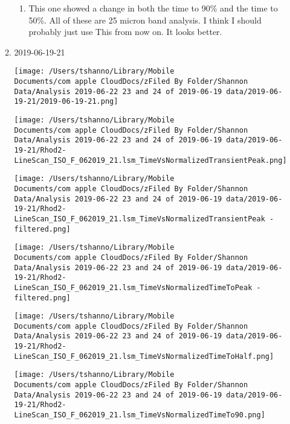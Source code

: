 \documentclass[11pt]{article}
\begin{document}
\begin{enumerate}
\begin{enumerate}
\begin{center}
\end{center}
\begin{enumerate}
\item This one showed a change in both the time to 90\% and the time to 50\%.  All of these are 25 micron band analysis.  I think I should probably just use This from now on.  It looks better.
\label{sec:orge5cdcd6}
\end{enumerate}
\item 2019-06-19-21
\label{sec:org0ad15fa}
\begin{center}
\texttt{[image: /Users/tshanno/Library/Mobile Documents/com~apple~CloudDocs/zFiled By Folder/Shannon Data/Analysis 2019-06-22 23 and 24 of 2019-06-19 data/2019-06-19-21/2019-06-19-21.png]}
\end{center}
\begin{center}
\texttt{[image: /Users/tshanno/Library/Mobile Documents/com~apple~CloudDocs/zFiled By Folder/Shannon Data/Analysis 2019-06-22 23 and 24 of 2019-06-19 data/2019-06-19-21/Rhod2-LineScan\_ISO\_F\_062019\_21.lsm\_TimeVsNormalizedTransientPeak.png]}
\end{center}
\begin{center}
\texttt{[image: /Users/tshanno/Library/Mobile Documents/com~apple~CloudDocs/zFiled By Folder/Shannon Data/Analysis 2019-06-22 23 and 24 of 2019-06-19 data/2019-06-19-21/Rhod2-LineScan\_ISO\_F\_062019\_21.lsm\_TimeVsNormalizedTransientPeak - filtered.png]}
\end{center}
\begin{center}
\texttt{[image: /Users/tshanno/Library/Mobile Documents/com~apple~CloudDocs/zFiled By Folder/Shannon Data/Analysis 2019-06-22 23 and 24 of 2019-06-19 data/2019-06-19-21/Rhod2-LineScan\_ISO\_F\_062019\_21.lsm\_TimeVsNormalizedTimeToPeak - filtered.png]}
\end{center}
\begin{center}
\texttt{[image: /Users/tshanno/Library/Mobile Documents/com~apple~CloudDocs/zFiled By Folder/Shannon Data/Analysis 2019-06-22 23 and 24 of 2019-06-19 data/2019-06-19-21/Rhod2-LineScan\_ISO\_F\_062019\_21.lsm\_TimeVsNormalizedTimeToHalf.png]}
\end{center}
\begin{center}
\texttt{[image: /Users/tshanno/Library/Mobile Documents/com~apple~CloudDocs/zFiled By Folder/Shannon Data/Analysis 2019-06-22 23 and 24 of 2019-06-19 data/2019-06-19-21/Rhod2-LineScan\_ISO\_F\_062019\_21.lsm\_TimeVsNormalizedTimeTo90.png]}

\end{center}
\end{enumerate}
\end{enumerate}
\end{document}
